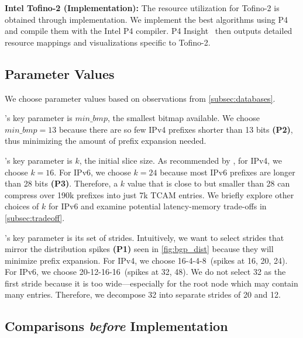 
{\bf Intel Tofino-2 (Implementation):} The resource utilization for Tofino-2 is obtained through implementation. We implement the best \cram algorithms using P4 and compile them with the Intel P4 compiler. P4 Insight~\cite{p4_insight} then outputs detailed resource mappings and visualizations specific to Tofino-2.

\subsection{Parameter Values} \label{subsec:parameters}

We choose parameter values based on observations from \cref{subsec:databases}.

\resail's key parameter is $min\_bmp$, the smallest bitmap available. We choose $min\_bmp=13$ because there are so few IPv4 prefixes shorter than 13 bits {\bf (P2)}, thus minimizing the amount of prefix expansion needed.

\bsic's key parameter is $k$, the initial slice size. As recommended by \cite{dxr}, for IPv4, we choose $k=16$. For IPv6, we choose $k=24$ because most IPv6 prefixes are longer than 28 bits {\bf (P3)}. Therefore, a $k$ value that is close to but smaller than 28 can compress over 190k prefixes into just 7k TCAM entries. We briefly explore other choices of $k$ for IPv6 and examine potential latency-memory trade-offs in \cref{subsec:tradeoff}.

\mashup's key parameter is its set of strides. Intuitively, we want to select strides that mirror the distribution spikes {\bf (P1)} seen in \cref{fig:bgp_dist} because they will minimize prefix expansion. For IPv4, we choose 16-4-4-8~(spikes at 16, 20, 24). For IPv6, we choose 20-12-16-16~(spikes at 32, 48). We do not select 32 as the first stride because it is too wide---especially for the root node which may contain many entries. Therefore, we decompose 32 into separate strides of 20 and 12.

\subsection{Comparisons {\em before} Implementation} \label{subsec:before_implementation}

